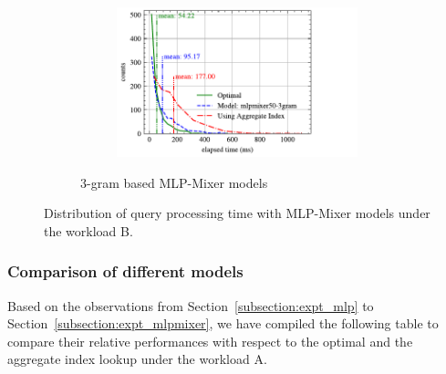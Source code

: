 \documentclass[conference]{IEEEtran}
\begin{document}
\begin{figure}[!h]
\begin{subfigure}{0.45\textwidth}
\begin{subfigure}{\textwidth}
		\end{subfigure}
		\vfill
		\begin{subfigure}{\textwidth}
			\centering
			\includegraphics[]{graphics/perf_dist_mlpmixer50_3gram_B.pdf}
		\end{subfigure}
		\caption{3-gram based MLP-Mixer models}
	\end{subfigure}
	\caption{Distribution of query processing time with MLP-Mixer models under the workload B.}
	\label{fig:mlpmixer_perf_all_B}
\end{figure}

\subsubsection{Comparison of different models}

Based on the observations from Section~\ref{subsection:expt_mlp} to Section~\ref{subsection:expt_mlpmixer}, we have compiled the following table to compare their relative performances with respect to the optimal and the aggregate index lookup under the workload A.
\end{document}
